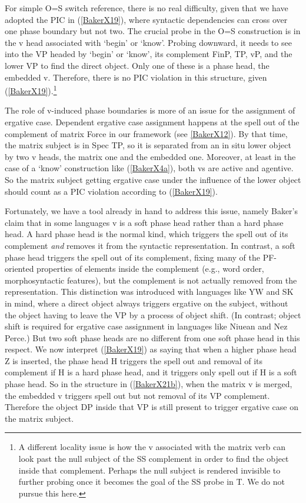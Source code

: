 \documentclass[output=paper]{langscibook}
\begin{document}
For simple O=S switch reference, there is no real difficulty, given that we have adopted the PIC in (\ref{BakerX19}), where syntactic dependencies can cross over one phase boundary but not two. The crucial probe in the O=S construction is in the v head associated with ‘begin’ or ‘know’. Probing downward, it needs to see into the VP headed by ‘begin’ or ‘know’, its complement FinP, TP, vP, and the lower VP to find the direct object. Only one of these is a phase head, the embedded v. Therefore, there is no PIC violation in this structure, given (\ref{BakerX19}).\footnote{A different locality issue is how the v associated with the matrix verb can look past the null subject of the SS complement in order to find the object inside that complement. Perhaps the null subject is rendered invisible to further probing once it becomes the goal of the SS probe in T. We do not pursue this here.}

The role of v-induced phase boundaries is more of an issue for the assignment of ergative case. Dependent ergative case assignment happens at the spell out of the complement of matrix Force in our framework (see \ref{BakerX12}). By that time, the matrix subject is in Spec TP, so it is separated from an in situ lower object by two v heads, the matrix one and the embedded one. Moreover, at least in the case of a `know’ construction like (\ref{BakerX4a}), both vs are active and agentive. So the matrix subject getting ergative case under the influence of the lower object should count as a PIC violation according to (\ref{BakerX19}).

Fortunately, we have a tool already in hand to address this issue, namely Baker’s \citeyearpar{baker2015case} claim that in some languages v is a soft phase head rather than a hard phase head. A hard phase head is the normal kind, which triggers the spell out of its complement \textit{and} removes it from the syntactic representation. In contrast, a soft phase head triggers the spell out of its complement, fixing many of the PF-oriented properties of elements inside the complement (e.g., word order, morphosyntactic features), but the complement is not actually removed from the representation. This distinction was introduced with languages like YW and SK in mind, where a direct object always triggers ergative on the subject, without the object having to leave the VP by a process of object shift. (In contrast; object shift is required for ergative case assignment in languages like Niuean and Nez Perce.) But two soft phase heads are no different from one soft phase head in this respect. We now interpret (\ref{BakerX19}) as saying that when a higher phase head Z is inserted, the phase head H triggers the spell out and removal of its complement if H is a hard phase head, and it triggers only spell out if H is a soft phase head. So in the structure in (\ref{BakerX21b}), when the matrix v is merged, the embedded v triggers spell out but not removal of its VP complement. Therefore the object DP inside that VP is still present to trigger ergative case on the matrix subject.
\end{document}
